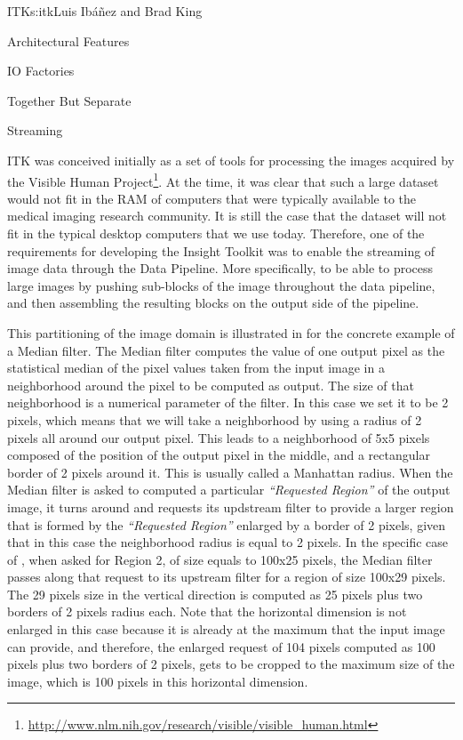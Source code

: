 \begin{aosachapter}{ITK}{s:itk}{Luis Ib\'{a}\~{n}ez and Brad King}
\begin{aosasect1}{Architectural Features}
\begin{aosasect2}{IO Factories}
\begin{aosasect3}{Together But Separate}
\end{aosasect3}

\end{aosasect2}

\begin{aosasect2}{Streaming}\label{sec.itk.streaming}

ITK was conceived initially as a set of tools for processing the images
acquired by the Visible Human
Project\footnote{\url{http://www.nlm.nih.gov/research/visible/visible_human.html}}.
At the time, it was clear that such a large dataset would not fit in the RAM of
computers that were typically available to the medical imaging research
community. It is still the case that the dataset will not fit in the typical
desktop computers that we use today. Therefore, one of the requirements for
developing the Insight Toolkit was to enable the streaming of image data
through the Data Pipeline. More specifically, to be able to process large
images by pushing sub-blocks of the image throughout the data pipeline, and then
assembling the resulting blocks on the output side of the pipeline.


This partitioning of the image domain is illustrated in
 for the concrete example of a Median filter. The
Median filter computes the value of one output pixel as the statistical median
of the pixel values taken from the input image in a neighborhood around the
pixel to be computed as output. The size of that neighborhood is a numerical
parameter of the filter. In this case we set it to be 2 pixels, which means
that we will take a neighborhood by using a radius of 2 pixels all around our
output pixel. This leads to a neighborhood of 5x5 pixels composed of the
position of the output pixel in the middle, and a rectangular border of 2
pixels around it. This is usually called a Manhattan radius. When the Median
filter is asked to computed a particular \emph{``Requested Region''} of the
output image, it turns around and requests its updstream filter to provide a
larger region that is formed by the \emph{``Requested Region''} enlarged by a
border of 2 pixels, given that in this case the neighborhood radius is equal to
2 pixels. In the specific case of , when asked
for Region 2, of size equals to 100x25 pixels, the Median filter passes along
that request to its upstream filter for a region of size 100x29 pixels. The 29
pixels size in the vertical direction is computed as 25 pixels plus two borders
of 2 pixels radius each. Note that the horizontal dimension is not enlarged in
this case because it is already at the maximum that the input image can
provide, and therefore, the enlarged request of 104 pixels computed as 100
pixels plus two borders of 2 pixels, gets to be cropped to the maximum size of
the image, which is 100 pixels in this horizontal dimension.


\end{aosasect2}
\end{aosasect1}
\end{aosachapter}
